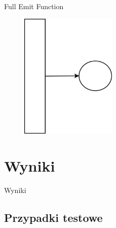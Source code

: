 \documentclass{beamer}
\begin{document}
\begin{frame}{Full Emit Function}
\begin{figure}[H]
	\begin{center}
  		\includegraphics[height=6cm]{PresentationFull.png}
	\end{center}
\end{figure}
\end{frame}


\section{Wyniki}
\begin{frame}{}
\begin{center}
\huge{Wyniki}
\end{center}
\end{frame}

\subsection*{Przypadki testowe}
\end{document}
